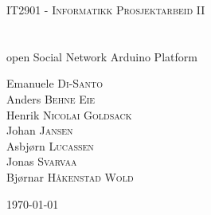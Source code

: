 \begin{titlepage}
	\begin{center}
		\textsc{\Large IT2901 - Informatikk Prosjektarbeid II}\\[0.5cm]
		\HRule \\[0.6cm]
		{ \huge \bfseries \project}\\[0.4cm]
		open Social Network Arduino Platform
		\HRule \\[1.5cm]
		\begin{center} \large
			Emanuele \textsc{Di-Santo} \\
			Anders \textsc{Behne Eie} \\
			Henrik \textsc{Nicolai Goldsack} \\
			Johan \textsc{Jansen} \\
			Asbjørn \textsc{Lucassen} \\
			Jonas \textsc{Svarvaa} \\
			Bjørnar \textsc{Håkenstad Wold}
		\end{center}
		\vfill
		{\large \today}
	\end{center}
\end{titlepage}
